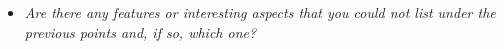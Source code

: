 
\begin{itemize}
\item \emph{Are there any features or interesting aspects that you could not list under the previous points and, if so, which one?}
\end{itemize}
